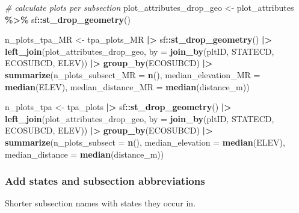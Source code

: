\documentclass[
]{book}
\newenvironment{Shaded}{\begin{snugshade}}{\end{snugshade}}
\newcommand{\AttributeTok}[1]{\textcolor[rgb]{0.13,0.29,0.53}{#1}}
\newcommand{\CommentTok}[1]{\textcolor[rgb]{0.56,0.35,0.01}{\textit{#1}}}
\newcommand{\FunctionTok}[1]{\textcolor[rgb]{0.13,0.29,0.53}{\textbf{#1}}}
\newcommand{\NormalTok}[1]{#1}
\newcommand{\OtherTok}[1]{\textcolor[rgb]{0.56,0.35,0.01}{#1}}
\newcommand{\SpecialCharTok}[1]{\textcolor[rgb]{0.81,0.36,0.00}{\textbf{#1}}}
\begin{document}
\begin{Shaded}
\begin{Highlighting}[]
\CommentTok{\# calculate plots per subsection}
\NormalTok{plot\_attributes\_drop\_geo }\OtherTok{\textless{}{-}}\NormalTok{ plot\_attributes }\SpecialCharTok{\%\textgreater{}\%}
\NormalTok{  sf}\SpecialCharTok{::}\FunctionTok{st\_drop\_geometry}\NormalTok{()}

\NormalTok{n\_plots\_tpa\_MR }\OtherTok{\textless{}{-}}\NormalTok{ tpa\_plots\_MR }\SpecialCharTok{|\textgreater{}}
\NormalTok{  sf}\SpecialCharTok{::}\FunctionTok{st\_drop\_geometry}\NormalTok{() }\SpecialCharTok{|\textgreater{}}
  \FunctionTok{left\_join}\NormalTok{(plot\_attributes\_drop\_geo, }
            \AttributeTok{by =} \FunctionTok{join\_by}\NormalTok{(pltID, STATECD, ECOSUBCD, ELEV)) }\SpecialCharTok{|\textgreater{}}
  \FunctionTok{group\_by}\NormalTok{(ECOSUBCD) }\SpecialCharTok{|\textgreater{}}
  \FunctionTok{summarize}\NormalTok{(}\AttributeTok{n\_plots\_subsect\_MR =} \FunctionTok{n}\NormalTok{(),}
            \AttributeTok{median\_elevation\_MR =} \FunctionTok{median}\NormalTok{(ELEV),}
            \AttributeTok{median\_distance\_MR =} \FunctionTok{median}\NormalTok{(distance\_m))}

\NormalTok{n\_plots\_tpa }\OtherTok{\textless{}{-}}\NormalTok{ tpa\_plots }\SpecialCharTok{|\textgreater{}}
\NormalTok{  sf}\SpecialCharTok{::}\FunctionTok{st\_drop\_geometry}\NormalTok{() }\SpecialCharTok{|\textgreater{}}
  \FunctionTok{left\_join}\NormalTok{(plot\_attributes\_drop\_geo, }
            \AttributeTok{by =} \FunctionTok{join\_by}\NormalTok{(pltID, STATECD, ECOSUBCD, ELEV)) }\SpecialCharTok{|\textgreater{}}
  \FunctionTok{group\_by}\NormalTok{(ECOSUBCD) }\SpecialCharTok{|\textgreater{}}
  \FunctionTok{summarize}\NormalTok{(}\AttributeTok{n\_plots\_subsect =} \FunctionTok{n}\NormalTok{(),}
            \AttributeTok{median\_elevation =} \FunctionTok{median}\NormalTok{(ELEV),}
            \AttributeTok{median\_distance =} \FunctionTok{median}\NormalTok{(distance\_m))}
\end{Highlighting}
\end{Shaded}

\hypertarget{add-states-and-subsection-abbreviations}{%
\subsubsection{Add states and subsection abbreviations}\label{add-states-and-subsection-abbreviations}}

Shorter subsection names with states they occur in.
\end{document}
